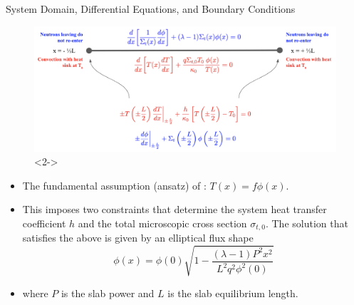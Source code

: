\documentclass[9pt,t]{beamer}
\begin{document}
\begin{frame}{System Domain, Differential Equations, and Boundary Conditions}
    \pause
    \begin{figure}[T]
        \centering
        \includegraphics[width=0.725\linewidth]{figures/1D_Benchmark_Diagram.png}<2->
    \end{figure}
    \begin{itemize}
        \item<3-> The fundamental assumption (ansatz) of \cite{analytical-benchmark}: $T(x)=f\phi(x)$.
        \item<4-> This imposes two constraints that determine the system heat transfer coefficient $h$ and the
        total microscopic cross section $\sigma_{t,0}$. The solution that satisfies the above is given by
        an elliptical flux shape
        \begin{equation}
            \phi(x) = \phi(0) \sqrt{1 - \frac{(\lambda - 1)P^{2}x^{2}}{L^{2}q^{2}\phi^2(0)}}
        \end{equation}
        \item<5-> where $P$ is the slab power and $L$ is the slab equilibrium length.
    \end{itemize}
\end{frame}

\end{document}
